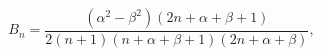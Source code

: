 \[B_{n}=\dfrac{(\alpha^{2}-\beta^{2})(2n+\alpha+\beta+1)}{2(n+1)(n+\alpha+\beta+%
1)(2n+\alpha+\beta)},\]